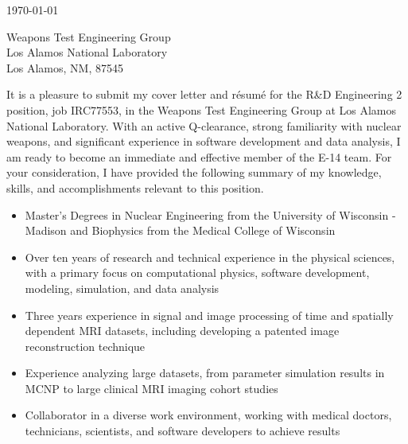 
\begin{center}
\begin{minipage}{\textwidth}

  \normalsize

  \vspace{6mm} 

  \today \\
  \vspace{4mm}
	
	Weapons Test Engineering Group \\
	Los Alamos National Laboratory \\
	Los Alamos, NM, 87545 \\
  
  \vspace{4mm} 


	It is a pleasure to submit my cover letter and r\'{e}sum\'{e} for the R\&D Engineering 2 position, job IRC77553, in the Weapons Test Engineering Group at Los Alamos National Laboratory.
  With an active Q-clearance, strong familiarity with nuclear weapons, and significant experience in software development and data analysis, I am ready to become an immediate and effective member of the E-14 team.
  For your consideration, I have provided the following summary of my knowledge, skills, and accomplishments relevant to this position. \\

  \begin{itemize}[leftmargin=.45in,rightmargin=.45in,itemsep=1.6mm]

	\item Master's Degrees in Nuclear Engineering from the University of Wisconsin - Madison and Biophysics from the Medical College of Wisconsin
	\item Over ten years of research and technical experience in the physical sciences, with a primary focus on computational physics, software development, modeling, simulation, and data analysis
	\item Three years experience in signal and image processing of time and spatially dependent MRI datasets, including developing a patented image reconstruction technique
	\item Experience analyzing large datasets, from parameter simulation results in MCNP to large clinical MRI imaging cohort studies %
	\item Collaborator in a diverse work environment, working with medical doctors, technicians, scientists, and software developers to achieve results


\end{itemize}
\end{minipage}
\end{center}
